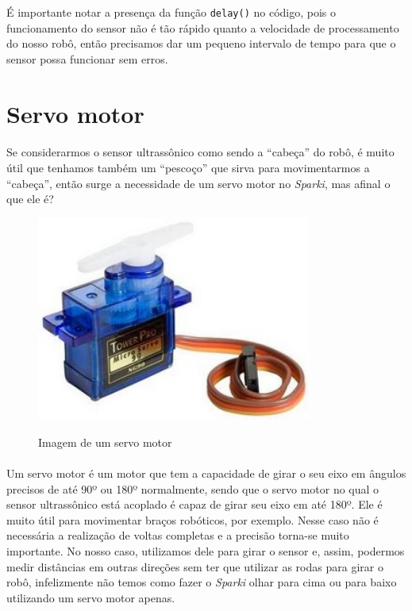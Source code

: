     É importante notar a presença da função \lstinline[columns=fixed]{delay()} no código, pois o funcionamento do sensor não é tão rápido quanto a velocidade de processamento do nosso robô, então precisamos dar um pequeno intervalo de tempo para que o sensor possa funcionar sem erros.
    
\section{Servo motor}
    
    \paragraph{}
    Se considerarmos o sensor ultrassônico como sendo a ``cabeça'' do robô, é muito útil que tenhamos também um ``pescoço'' que sirva para movimentarmos a ``cabeça'', então surge a necessidade de um servo motor no \textit{Sparki}, mas afinal o que ele é?
    
    \begin{figure}[h]
    \caption{Imagem de um servo motor}
    
    \centering 
    \includegraphics[width=9cm]{Figuras/servo.jpg}
    \label{figura:servo.jpeg}
    \end{figure}

    \paragraph{}
    Um servo motor é um motor que tem a capacidade de girar o seu eixo em ângulos precisos de até 90º ou 180º normalmente, sendo que o servo motor no qual o sensor ultrassônico está acoplado é capaz de girar seu eixo em até 180º. Ele é muito útil para movimentar braços robóticos, por exemplo. Nesse caso não é necessária a realização de voltas completas e a precisão torna-se muito importante. No nosso caso, utilizamos dele para girar o sensor e, assim, podermos medir distâncias em outras direções sem ter que utilizar as rodas para girar o robô, infelizmente não temos como fazer o \textit{Sparki} olhar para cima ou para baixo utilizando um servo motor apenas.
    

